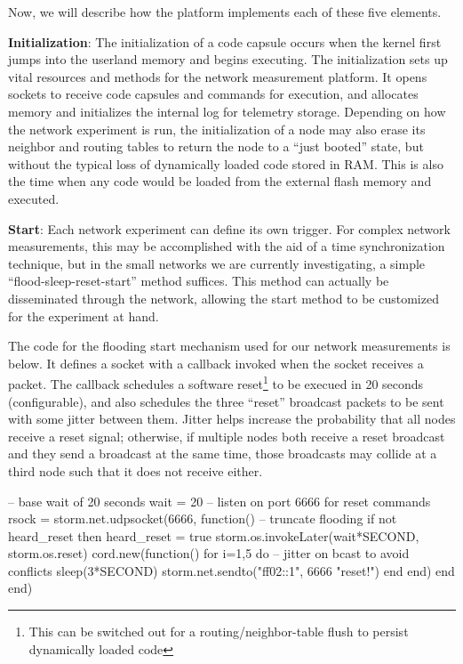 Now, we will describe how the platform implements each of these five elements.

\textbf{Initialization}: The initialization of a code capsule occurs when the kernel first jumps into the userland memory and begins executing.
The initialization sets up vital resources and methods for the network measurement platform.
It opens sockets to receive code capsules and commands for execution, and allocates memory and initializes the internal log for telemetry storage.
Depending on how the network experiment is run, the initialization of a node may also erase its neighbor and routing tables to return the node to a ``just booted'' state, but without the typical loss of dynamically loaded code stored in RAM.
This is also the time when any code would be loaded from the external flash memory and executed.

\textbf{Start}: Each network experiment can define its own trigger.
For complex network measurements, this may be accomplished with the aid of a time synchronization technique, but in the small networks we are currently investigating, a simple ``flood-sleep-reset-start'' method suffices.
This method can actually be disseminated through the network, allowing the start method to be customized for the experiment at hand.

The code for the flooding start mechanism used for our network measurements is below.
It defines a socket with a callback invoked when the socket receives a packet.
The callback schedules a software reset\footnote{This can be switched out for a routing/neighbor-table flush to persist dynamically loaded code} to be execued in 20 seconds (configurable), and also schedules the three ``reset'' broadcast packets to be sent with some jitter between them.
Jitter helps increase the probability that all nodes receive a reset signal; otherwise, if multiple nodes both receive a reset broadcast and they send a broadcast at the same time, those broadcasts may collide at a third node such that it does not receive either.

\begin{luacode}
-- base wait of 20 seconds
wait = 20
-- listen on port 6666 for reset commands
rsock = storm.net.udpsocket(6666, function()
 -- truncate flooding
 if not heard_reset then
  heard_reset = true
  storm.os.invokeLater(wait*SECOND, storm.os.reset)
  cord.new(function()
   for i=1,5 do
    -- jitter on bcast to avoid conflicts
    sleep(3*SECOND)
    storm.net.sendto("ff02::1", 6666 "reset!")
   end
  end)
 end
end)
\end{luacode}

